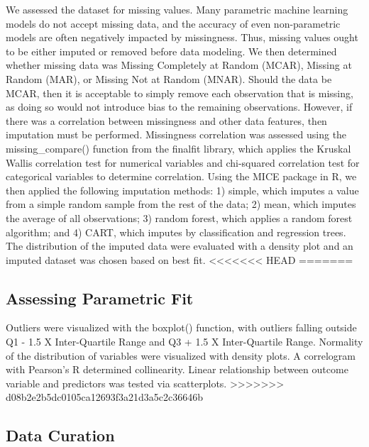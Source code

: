 \documentclass[11pt,]{article}
\begin{document}
We assessed the dataset for missing values. Many parametric machine
learning models do not accept missing data, and the accuracy of even
non-parametric models are often negatively impacted by missingness.
Thus, missing values ought to be either imputed or removed before data
modeling. We then determined whether missing data was Missing Completely
at Random (MCAR), Missing at Random (MAR), or Missing Not at Random
(MNAR). Should the data be MCAR, then it is acceptable to simply remove
each observation that is missing, as doing so would not introduce bias
to the remaining observations. However, if there was a correlation
between missingness and other data features, then imputation must be
performed. Missingness correlation was assessed using the
missing\_compare() function from the finalfit library, which applies the
Kruskal Wallis correlation test for numerical variables and chi-squared
correlation test for categorical variables to determine correlation.
Using the MICE package in R, we then applied the following imputation
methods: 1) simple, which imputes a value from a simple random sample
from the rest of the data; 2) mean, which imputes the average of all
observations; 3) random forest, which applies a random forest algorithm;
and 4) CART, which imputes by classification and regression trees. The
distribution of the imputed data were evaluated with a density plot and
an imputed dataset was chosen based on best fit.
<<<<<<< HEAD
=======

\hypertarget{assessing-parametric-fit}{%
\subsection{Assessing Parametric Fit}\label{assessing-parametric-fit}}

Outliers were visualized with the boxplot() function, with outliers
falling outside Q1 - 1.5 X Inter-Quartile Range and Q3 + 1.5 X
Inter-Quartile Range. Normality of the distribution of variables were
visualized with density plots. A correlogram with Pearson's R determined
collinearity. Linear relationship between outcome variable and
predictors was tested via scatterplots.
>>>>>>> d08b2e2b5dc0105ca12693f3a21d3a5c2c36646b

\hypertarget{data-curation}{%
\subsection{Data Curation}\label{data-curation}}
\end{document}
